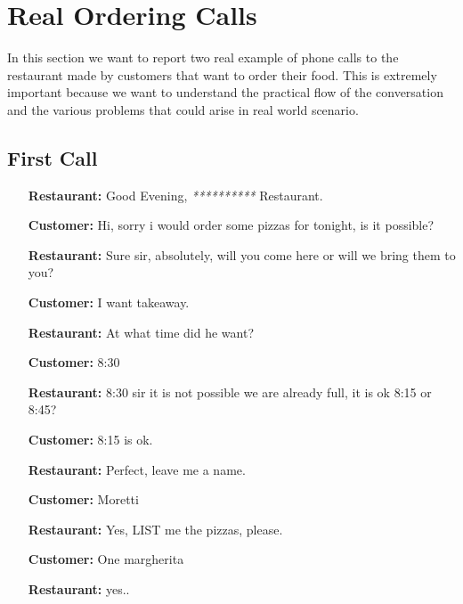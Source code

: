 \section{Real Ordering Calls}

In this section we want to report two real example of phone calls to the restaurant made by customers that want to order their food. This is extremely important because we want to understand the practical flow of the conversation and the various problems that could arise in real world scenario.

\subsection*{First Call}

\begin{itemize}

\item[\textbf{Restaurant:}] Good Evening, \textit{**********} Restaurant.

\item[\textbf{Customer:}] Hi, sorry i would order some pizzas for tonight, is it possible? 

\item[\textbf{Restaurant:}] Sure sir, absolutely, will you come here or will we bring them to you? 

\item[\textbf{Customer:}] I want takeaway.

\item[\textbf{Restaurant:}] At what time did he want? 

\item[\textbf{Customer:}]  8:30

\item[\textbf{Restaurant:}] 8:30 sir it is not possible we are already full, it is ok 8:15 or 8:45? 

\item[\textbf{Customer:}] 8:15 is ok. 

\item[\textbf{Restaurant:}] Perfect, leave me a name. 

\item[\textbf{Customer:}] Moretti

\item[\textbf{Restaurant:}] Yes, LIST me the pizzas, please. 

\item[\textbf{Customer:}]  One margherita

\item[\textbf{Restaurant:}] yes..


\end{itemize}
